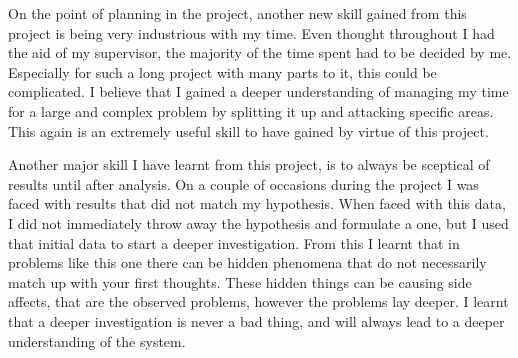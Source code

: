 \documentclass[12pt]{report}
\begin{document}
On the point of planning in the project, another new skill gained from this project is being very industrious with my time. Even thought throughout I had the aid of my supervisor, the majority of the time spent had to be decided by me. Especially for such a long project with many parts to it, this could be complicated. I believe that I gained a deeper understanding of managing my time for a large and complex problem by splitting it up and attacking specific areas. This again is an extremely useful skill to have gained by virtue of this project. 

Another major skill I have learnt from this project, is to always be sceptical of results until after analysis. On a couple of occasions during the project I was faced with results that did not match my hypothesis. When faced with this data, I did not immediately throw away the hypothesis and formulate a one, but I used that initial data to start a deeper investigation. From this I learnt that in problems like this one there can be hidden phenomena that do not necessarily match up with your first thoughts. These hidden things can be causing side affects, that are the observed problems, however the problems lay deeper. I learnt that a deeper investigation is never a bad thing, and will always lead to a deeper understanding of the system.

\clearpage
\end{document}
